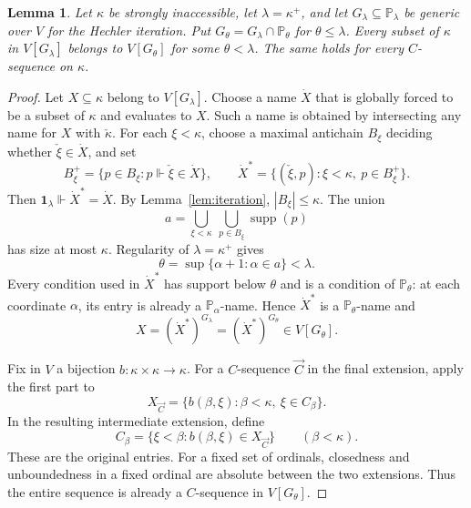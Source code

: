 \documentclass[10pt,a4paper]{amsart}
\newtheorem{lemma}[theorem]{Lemma}
\theoremstyle{definition}
\theoremstyle{remark}
\newcommand{\PP}{\mathbb P}
\DeclareMathOperator{\supp}{supp}
\begin{document}
\begin{lemma}\label{lem:localization}
Let \(\kappa\) be strongly inaccessible, let \(\lambda=\kappa^+\),
and let \(G_\lambda\subseteq\PP_\lambda\) be generic over
\(V\) for the Hechler iteration. Put
\(G_\theta=G_\lambda\cap\PP_\theta\) for
\(\theta\leq\lambda\). Every subset of \(\kappa\) in
\(V[G_\lambda]\) belongs to \(V[G_\theta]\) for some
\(\theta<\lambda\). The same holds for every \(C\)-sequence
on \(\kappa\).
\end{lemma}
\begin{proof}
Let \(X\subseteq\kappa\) belong to \(V[G_\lambda]\).
Choose a name \(\dot X\) that is globally forced to
be a subset of \(\kappa\) and evaluates to \(X\).
Such a name is obtained by intersecting any name for
\(X\) with \(\check\kappa\). For each \(\xi<\kappa\),
choose a maximal antichain \(B_\xi\) deciding whether
\(\check\xi\in\dot X\), and set
\[
 B_\xi^+=\{p\in B_\xi:p\Vdash\check\xi\in\dot X\},
 \qquad
 \dot X^*=\{(\check\xi,p):\xi<\kappa,\ p\in B_\xi^+\}.
\]
Then \(\mathbf1_\lambda\Vdash\dot X^*=\dot X\).
By Lemma~\ref{lem:iteration}, \(|B_\xi|\leq\kappa\).
The union
\[
 a=\bigcup_{\xi<\kappa}\ \bigcup_{p\in B_\xi}\supp(p)
\]
has size at most \(\kappa\). Regularity of
\(\lambda=\kappa^+\) gives
\[
 \theta=\sup\{\alpha+1:\alpha\in a\}<\lambda.
\]
Every condition used in \(\dot X^*\) has support
below \(\theta\) and is a condition of \(\PP_\theta\):
at each coordinate \(\alpha\), its entry is already
a \(\PP_\alpha\)-name. Hence \(\dot X^*\) is a
\(\PP_\theta\)-name and
\[
 X=(\dot X^*)^{G_\lambda}
        =(\dot X^*)^{G_\theta}\in V[G_\theta].
\]

Fix in \(V\) a bijection \(b:\kappa\times\kappa\to\kappa\).
For a \(C\)-sequence \(\vec C\) in the final
extension, apply the first part to
\[
 X_{\vec C}=\{b(\beta,\xi):\beta<\kappa,\ \xi\in C_\beta\}.
\]
In the resulting intermediate extension, define
\[
 C_\beta=\{\xi<\beta:b(\beta,\xi)\in X_{\vec C}\}
                                             \qquad(\beta<\kappa).
\]
These are the original entries. For a fixed set of
ordinals, closedness and unboundedness in a fixed ordinal
are absolute between the two extensions. Thus the entire
sequence is already a \(C\)-sequence in \(V[G_\theta]\).
\end{proof}
\end{document}
